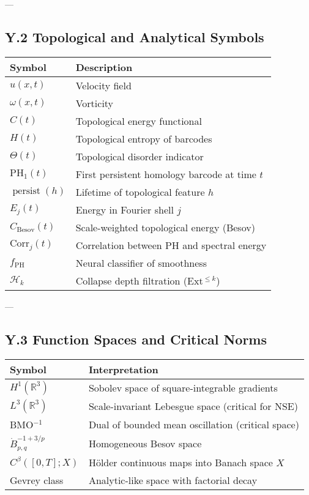 \documentclass[11pt]{article}
\theoremstyle{definition}
\begin{document}
---

\subsection*{Y.2 Topological and Analytical Symbols}

\begin{tabular}{ll}
\textbf{Symbol} & \textbf{Description} \\
\hline
$u(x,t)$ & Velocity field \\
$\omega(x,t)$ & Vorticity \\
$C(t)$ & Topological energy functional \\
$H(t)$ & Topological entropy of barcodes \\
$\Theta(t)$ & Topological disorder indicator \\
$\mathrm{PH}_1(t)$ & First persistent homology barcode at time $t$ \\
$\operatorname{persist}(h)$ & Lifetime of topological feature $h$ \\
$E_j(t)$ & Energy in Fourier shell $j$ \\
$C_{\mathrm{Besov}}(t)$ & Scale-weighted topological energy (Besov) \\
$\mathrm{Corr}_j(t)$ & Correlation between PH and spectral energy \\
$f_{\mathrm{PH}}$ & Neural classifier of smoothness \\
$\mathcal{H}_k$ & Collapse depth filtration (Ext$^{\leq k}$) \\
\end{tabular}

---

\subsection*{Y.3 Function Spaces and Critical Norms}

\begin{tabular}{ll}
\textbf{Symbol} & \textbf{Interpretation} \\
\hline
$H^1(\mathbb{R}^3)$ & Sobolev space of square-integrable gradients \\
$L^3(\mathbb{R}^3)$ & Scale-invariant Lebesgue space (critical for NSE) \\
BMO$^{-1}$ & Dual of bounded mean oscillation (critical space) \\
$\dot{B}^{-1+3/p}_{p,q}$ & Homogeneous Besov space \\
$C^\beta([0,T];X)$ & Hölder continuous maps into Banach space $X$ \\
Gevrey class & Analytic-like space with factorial decay \\
\end{tabular}
\end{document}
